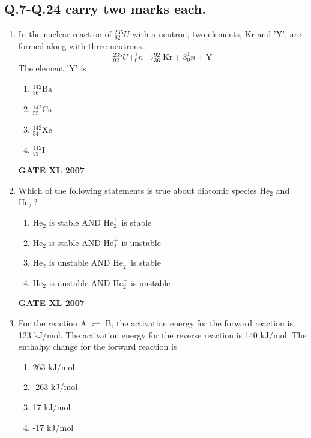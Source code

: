 \documentclass[journal,12pt,onecolumn]{IEEEtran}
\begin{document}
\subsection*{Q.7-Q.24 carry two marks each.}

\begin{enumerate}[resume]
    \item In the nuclear reaction of $^{235}_{92}U$ with a neutron, two elements, Kr and 'Y', are formed along with three neutrons. 
    \[^{235}_{92}U + ^{1}_{0}n \rightarrow ^{92}_{36}\text{Kr} + 3 ^{1}_{0}n + \text{Y}\]
    The element 'Y' is
    \begin{multicols}{4}
        \begin{enumerate} 
            \item $^{142}_{56}\text{Ba}$
            \item $^{142}_{55}\text{Cs}$
            \item $^{142}_{54}\text{Xe}$
            \item $^{142}_{53}\text{I}$
        \end{enumerate}
    \end{multicols}
	    \hfill \textbf{GATE XL 2007}

    \item Which of the following statements is true about diatomic species $\text{He}_{2}$ and $\text{He}_{2}^{+}$? 
        \begin{enumerate} 
            \item $\text{He}_{2}$ is stable AND $\text{He}_{2}^{+}$ is stable
            \item $\text{He}_{2}$ is stable AND $\text{He}_{2}^{+}$ is unstable
            \item $\text{He}_{2}$ is unstable AND $\text{He}_{2}^{+}$ is stable
            \item $\text{He}_{2}$ is unstable AND $\text{He}_{2}^{+}$ is unstable
        \end{enumerate}
    
	    \hfill \textbf{GATE XL 2007}

    \item For the reaction A $\rightleftharpoons$ B, the activation energy for the forward reaction is 123 kJ/mol. The activation energy for the reverse reaction is 140 kJ/mol. The enthalpy change for the forward reaction is 
    \begin{multicols}{4}
        \begin{enumerate} 
            \item 263 kJ/mol
            \item -263 kJ/mol
            \item 17 kJ/mol
            \item -17 kJ/mol
        \end{enumerate}
    \end{multicols}


\end{enumerate}
\end{document}
